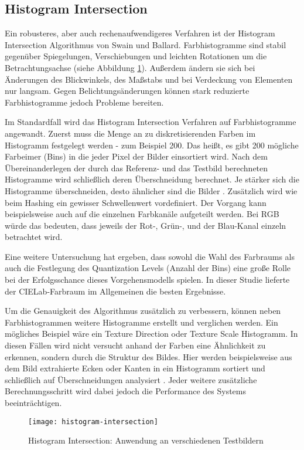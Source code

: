 \subsection{Histogram Intersection}
Ein robusteres, aber auch rechenaufwendigeres Verfahren ist der Histogram
Intersection Algorithmus von Swain und Ballard. Farbhistogramme sind stabil
gegenüber Spiegelungen, Verschiebungen und leichten Rotationen um die
Betrachtungsachse (siehe Abbildung \ref{fig:hintersection}). Außerdem ändern sie
sich bei Änderungen des Blickwinkels, des Maßstabs und bei Verdeckung von
Elementen nur langsam. Gegen Belichtungsänderungen können stark reduzierte
Farbhistogramme jedoch Probleme bereiten. \parencite{histogram-swain-ballard}

Im Standardfall wird das Histogram Intersection Verfahren auf Farbhistogramme
angewandt. Zuerst muss die Menge an zu diskretisierenden Farben im Histogramm
festgelegt werden - zum Beispiel 200. Das heißt, es gibt 200 mögliche
\glqq{}Farbeimer\grqq{} (Bins) in die jeder Pixel der Bilder einsortiert wird.
Nach dem Übereinanderlegen der durch das Referenz- und das Testbild berechneten
Histogramme wird schließlich deren Überschneidung berechnet. Je stärker sich
die Histogramme überschneiden, desto ähnlicher sind die Bilder
\parencite{histogram-image-similarity}. Zusätzlich wird wie beim Hashing ein
gewisser Schwellenwert vordefiniert. Der Vorgang kann beispielsweise auch auf
die einzelnen Farbkanäle aufgeteilt werden. Bei RGB würde das bedeuten, dass
jeweils der Rot-, Grün-, und der Blau-Kanal einzeln betrachtet wird.
\parencite{histogram-swain-ballard}

Eine weitere Untersuchung hat ergeben, dass sowohl die Wahl des Farbraums als
auch die Festlegung des Quantization Levels (Anzahl der Bins) eine große Rolle
bei der Erfolgsschance dieses Vorgehensmodells spielen. In dieser Studie
lieferte der CIELab-Farbraum im Allgemeinen die besten Ergebnisse.
\parencite{histogram-image-similarity}

Um die Genauigkeit des Algorithmus zusätzlich zu verbessern, können neben
Farbhistogrammen weitere Histogramme erstellt und verglichen werden. Ein
mögliches Beispiel wäre ein \glqq{}Texture Direction\grqq{} oder
\glqq{}Texture Scale\grqq{} Histogramm. In diesen Fällen wird nicht versucht
anhand der Farben eine Ähnlichkeit zu erkennen, sondern durch die Struktur des
Bildes. Hier werden beispielsweise aus dem Bild extrahierte Ecken oder Kanten in
ein Histogramm sortiert und schließlich auf Überschneidungen analysiert
\parencite{histogram-stackoverflow}. Jeder weitere zusätzliche
Berechnungsschritt wird dabei jedoch die Performance des Systems
beeinträchtigen.

\begin{figure}[H]
    \centering
    \texttt{[image: histogram-intersection]}
    \caption{Histogram Intersection: Anwendung an verschiedenen Testbildern}
    \label{fig:hintersection}
\end{figure}